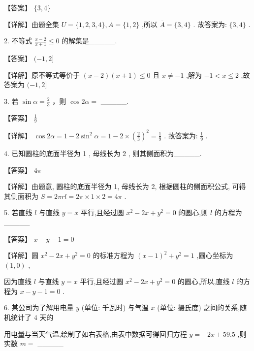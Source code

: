 \documentclass[10pt]{article}
\begin{document}
【答案】 \(\{ 3,4\}\)

【详解】由题全集 \(U = \{ 1,2,3,4\} ,A = \{ 1,2\}\) ,所以 \(\bar{A} = \{ 3,4\}\) . 故答案为: \(\{ 3,4\}\) .

2. 不等式 \(\frac{x - 2}{x + 1} \leq  0\) 的解集是\_\_\_\_\_.

【答案】 \(( - 1,2\rbrack\)

【详解】原不等式等价于 \(\left( {x - 2}\right) \left( {x + 1}\right)  \leq  0\) 且 \(x \neq   - 1\) ,解为 \(- 1 < x \leq  2\) ,故答案为 \(( - 1,2\rbrack\)

3. 若 \(\sin \alpha  = \frac{2}{3}\) ，则 \(\cos {2\alpha } =\) \_\_\_\_\_.

【答案】 \(\frac{1}{9}\)

【详解】 \(\cos {2\alpha } = 1 - 2{\sin }^{2}\alpha  = 1 - 2 \times  {\left( \frac{2}{3}\right) }^{2} = \frac{1}{9}\) . 故答案为: \(\frac{1}{9}\) .

4. 已知圆柱的底面半径为 1 , 母线长为 2 , 则其侧面积为\_\_\_\_\_.

【答案】 \({4\pi }\)

【详解】由题意, 圆柱的底面半径为 1, 母线长为 2, 根据圆柱的侧面积公式, 可得其侧面积为 \(S = {2\pi rl} = {2\pi } \times  1 \times  2 = {4\pi }\) .

5. 若直线 \(l\) 与直线 \(y = x\) 平行,且经过圆 \({x}^{2} - {2x} + {y}^{2} = 0\) 的圆心,则 \(l\) 的方程为\_\_\_\_\_

【答案】 \(x - y - 1 = 0\)

【详解】圆 \({x}^{2} - {2x} + {y}^{2} = 0\) 的标准方程为 \({\left( x - 1\right) }^{2} + {y}^{2} = 1\) ,圆心坐标为 \(\left( {1,0}\right)\) ,

因为直线 \(l\) 与直线 \(y = x\) 平行,且经过圆 \({x}^{2} - {2x} + {y}^{2} = 0\) 的圆心,所以,直线 \(l\) 的方程为 \(x - y - 1 = 0\) .

6. 某公司为了解用电量 \(y\) (单位: 千瓦时) 与气温 \(x\) (单位: 摄氏度) 之间的关系,随机统计了 4 天的

用电量与当天气温,绘制了如右表格,由表中数据可得回归方程 \(y =  - {2x} + {59.5}\) ,则实数 \(m =\) \_\_\_\_\_

\begin{center}
\end{center}
\end{document}

